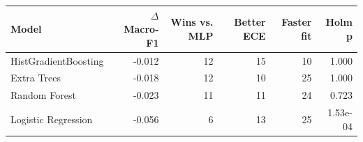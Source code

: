 \begin{tabular}{lrrrrr}
\hline
Model & $\Delta$ Macro-F1 & Wins vs. MLP & Better ECE & Faster fit & Holm p \\
\hline
HistGradientBoosting & -0.012 & 12 & 15 & 10 & 1.000 \\
Extra Trees & -0.018 & 12 & 10 & 25 & 1.000 \\
Random Forest & -0.023 & 11 & 11 & 24 & 0.723 \\
Logistic Regression & -0.056 & 6 & 13 & 25 & 1.53e-04 \\
\hline
\end{tabular}
